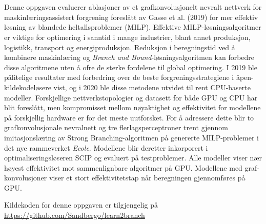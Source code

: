 \chapter*{\norwegianabstractname}
%
Denne oppgaven evaluerer ablasjoner av et grafkonvolusjonelt nevralt nettverk for maskinlæringsassistert forgrening foreslått av Gasse et al. (2019) for mer effektiv løsning av blandede heltallsproblemer (\gls{MILP}).
Effektive \gls{MILP}-løsningsalgoritmer er viktige for optimering i sanntid i mange industrier, blant annet produksjon, logistikk, transport og energiproduksjon. 
Reduksjon i beregningstid ved å kombinere maskinlæring og \textit{Branch and Bound}-løsningsalgoritmen kan forbedre disse algoritmene uten å ofre de sterke fordelene til global optimering.  
I 2019 ble pålitelige resultater med forbedring over de beste forgreningsstrategiene i åpen-kildekodeløsere vist, og i 2020 ble disse metodene utvidet til rent \gls{CPU}-baserte modeller.
Forskjellige nettverkstopologier og datasett for både \gls{GPU} og \gls{CPU} har blit foreslått, men kompromisset mellom nøyaktighet og effektivitet for modellene på forskjellig hardware er for det meste uutforsket. 
For å adressere dette blir to grafkonvolusjonale nevralnett og tre flerlagsperceptroner trent gjennom imitasjonslæring av Strong Branching-algoritmen på genererte \gls{MILP}-problemer i det nye rammeverket \textit{\gls{Ecole}}. Modellene blir deretter inkorporert i optimaliseringsløseren \gls{SCIP} og evaluert på testproblemer. Alle modeller viser nær høyest effektivitet mot sammenlignbare algoritmer på \gls{GPU}. Modellene med graf-konvolusjoner viser et stort effektivitetstap når beregningen gjennomføres på \gls{GPU}.

Kildekoden for denne oppgaven er tilgjengelig på\\ \url{https://github.com/Sandbergo/learn2branch}
\clearpage
